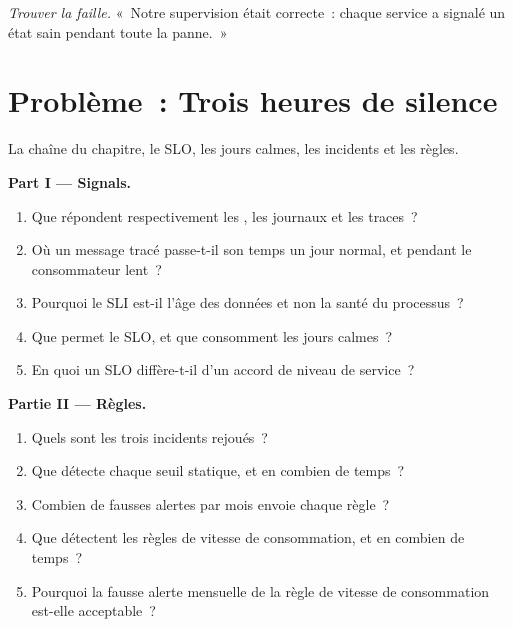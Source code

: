 \begin{exercise}[$\star\star\star$]\label{exo:pl:observability-and-incident-response:8}
\emph{Trouver la faille.} «~Notre supervision était correcte~: chaque service a signalé un état sain pendant toute la panne.~»
\end{exercise}

\section{Problème~: Trois heures de silence}

\begin{problem}\label{pb:pl:observability-and-incident-response:1}
La chaîne du chapitre, le SLO, les jours calmes, les incidents et les règles.

\medskip\noindent\textbf{Part I --- Signals.}
\begin{enumerate}
\item Que répondent respectivement les , les journaux et les traces~?
\item Où un message tracé passe-t-il son temps un jour normal, et pendant le consommateur lent~?
\item Pourquoi le SLI est-il l'âge des données et non la santé du processus~?
\item Que permet le SLO, et que consomment les jours calmes~?
\item En quoi un SLO diffère-t-il d'un accord de niveau de service~?
\end{enumerate}

\medskip\noindent\textbf{Partie II --- Règles.}
\begin{enumerate}[resume]
\item Quels sont les trois incidents rejoués~?
\item Que détecte chaque seuil statique, et en combien de temps~?
\item Combien de fausses alertes par mois envoie chaque règle~?
\item Que détectent les règles de vitesse de consommation, et en combien de temps~?
\item Pourquoi la fausse alerte mensuelle de la règle de vitesse de consommation est-elle acceptable~?
\end{enumerate}


\end{problem}

